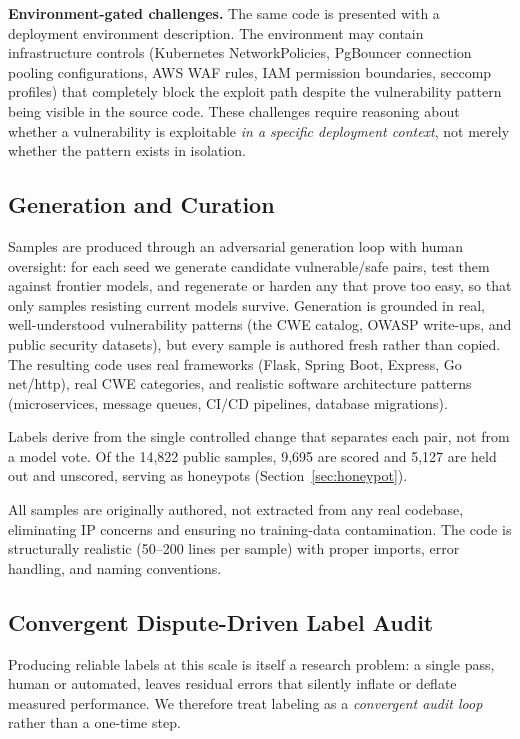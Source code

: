 \documentclass[conference]{IEEEtran}
\begin{document}
\textbf{Environment-gated challenges.} The same code is presented with a deployment environment description. The environment may contain infrastructure controls (Kubernetes NetworkPolicies, PgBouncer connection pooling configurations, AWS WAF rules, IAM permission boundaries, seccomp profiles) that completely block the exploit path despite the vulnerability pattern being visible in the source code. These challenges require reasoning about whether a vulnerability is exploitable \emph{in a specific deployment context}, not merely whether the pattern exists in isolation.

\subsection{Generation and Curation}

Samples are produced through an adversarial generation loop with human oversight: for each seed we generate candidate vulnerable/safe pairs, test them against frontier models, and regenerate or harden any that prove too easy, so that only samples resisting current models survive. Generation is grounded in real, well-understood vulnerability patterns (the CWE catalog, OWASP write-ups, and public security datasets), but every sample is authored fresh rather than copied. The resulting code uses real frameworks (Flask, Spring Boot, Express, Go net/http), real CWE categories, and realistic software architecture patterns (microservices, message queues, CI/CD pipelines, database migrations).

Labels derive from the single controlled change that separates each pair, not from a model vote. Of the 14,822 public samples, 9,695 are scored and 5,127 are held out and unscored, serving as honeypots (Section~\ref{sec:honeypot}).

All samples are originally authored, not extracted from any real codebase, eliminating IP concerns and ensuring no training-data contamination. The code is structurally realistic (50--200 lines per sample) with proper imports, error handling, and naming conventions.

\subsection{Convergent Dispute-Driven Label Audit}

Producing reliable labels at this scale is itself a research problem: a single pass, human or automated, leaves residual errors that silently inflate or deflate measured performance. We therefore treat labeling as a \emph{convergent audit loop} rather than a one-time step.
\end{document}
